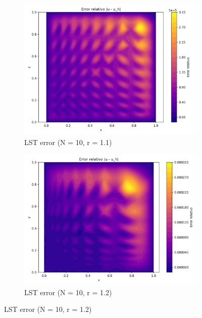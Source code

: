 \documentclass[12pt]{article}
\begin{document}
\begin{figure}[H]
    \centering
    \begin{subfigure}[t]{0.32\textwidth}
        \centering
        \includegraphics[width=\textwidth]{Graficos/11/LST_relative_error_colormap.png}
        \caption{LST error (N = 10, r = 1.1)}
        \label{fig:lst_error_r1.1}
    \end{subfigure}
    \hfill
    \begin{subfigure}[t]{0.32\textwidth}
        \centering
        \includegraphics[width=\textwidth]{Graficos/12/LST_relative_error_colormap.png}
        \caption{LST error (N = 10, r = 1.2)}
        \label{fig:lst_error_r1.2}
    \end{subfigure}

\end{figure}
\end{document}

